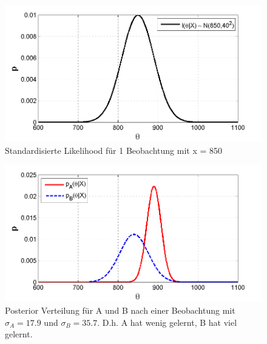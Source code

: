 \begin{figure}[!h]
	\begin{center}
		\includegraphics[width=130mm]{08_vorlesung/media/likelihood_1_Beobachtung.png}
		\caption{\label{fig:Beispiel_1_b} Standardisierte Likelihood
		für 1 Beobachtung mit x = 850}
	\end{center}
\end{figure}

\begin{figure}[!h]
	\begin{center}
		\includegraphics[width=130mm]{08_vorlesung/media/posterior_A_posterior_B.png}
		\caption{Posterior Verteilung für A und B 
		nach einer Beobachtung mit $\sigma_A = 17.9$ und $\sigma_B = 35.7$. D.h. A hat wenig gelernt, B hat viel gelernt.}
     	\label{fig:Beispiel_1_c}
	\end{center}
\end{figure}

